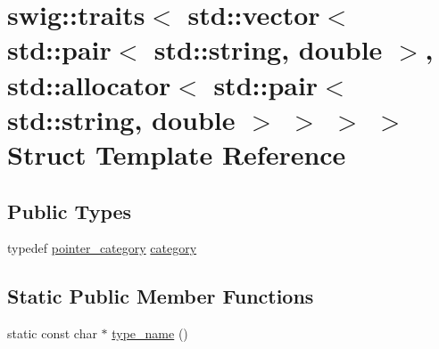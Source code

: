\hypertarget{structswig_1_1traits_3_01std_1_1vector_3_01std_1_1pair_3_01std_1_1string_00_01double_01_4_00_01s6c6fb1bc9490e700d02c7f6ac3d156bc}{}\section{swig\+:\+:traits$<$ std\+:\+:vector$<$ std\+:\+:pair$<$ std\+:\+:string, double $>$, std\+:\+:allocator$<$ std\+:\+:pair$<$ std\+:\+:string, double $>$ $>$ $>$ $>$ Struct Template Reference}
\label{structswig_1_1traits_3_01std_1_1vector_3_01std_1_1pair_3_01std_1_1string_00_01double_01_4_00_01s6c6fb1bc9490e700d02c7f6ac3d156bc}
\subsection*{Public Types}
\begin{DoxyCompactItemize}
\item 
typedef \hyperlink{structswig_1_1pointer__category}{pointer\+\_\+category} \hyperlink{structswig_1_1traits_3_01std_1_1vector_3_01std_1_1pair_3_01std_1_1string_00_01double_01_4_00_01s6c6fb1bc9490e700d02c7f6ac3d156bc_a9a691b761d2eb11d895b092619205fb6}{category}
\end{DoxyCompactItemize}
\subsection*{Static Public Member Functions}
\begin{DoxyCompactItemize}
\item 
static const char $\ast$ \hyperlink{structswig_1_1traits_3_01std_1_1vector_3_01std_1_1pair_3_01std_1_1string_00_01double_01_4_00_01s6c6fb1bc9490e700d02c7f6ac3d156bc_a03558625f9b3d6cec85935e75905abb6}{type\+\_\+name} ()
\end{DoxyCompactItemize}


